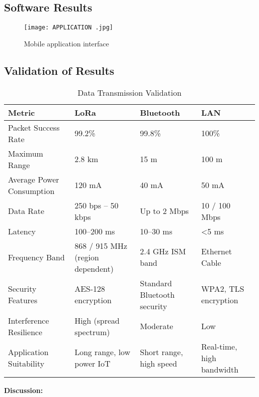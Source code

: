 \documentclass[12pt]{report}
\begin{document}
\subsection{Software Results}
\begin{figure}[H]
    \centering
    \texttt{[image: APPLICATION .jpg]}
    \caption{Mobile application interface}
    \label{fig:mobile_app}
\end{figure}

\subsection{Validation of Results}

\begin{table}[H]
\centering
\caption{Data Transmission Validation}
\label{tab:validation}
\renewcommand{\arraystretch}{1.2} %
\small %
\begin{tabularx}{\linewidth}{|l|X|X|X|}
\hline
\textbf{Metric} & \textbf{LoRa} & \textbf{Bluetooth} & \textbf{LAN} \\ \hline
Packet Success Rate & 99.2\% & 99.8\% & 100\% \\ \hline
Maximum Range & 2.8 km & 15 m & 100 m \\ \hline
Average Power Consumption & 120 mA & 40 mA & 50 mA \\ \hline
Data Rate & 250 bps – 50 kbps & Up to 2 Mbps & 10 / 100 Mbps \\ \hline
Latency & 100–200 ms & 10–30 ms & <5 ms \\ \hline
Frequency Band & 868 / 915 MHz (region dependent) & 2.4 GHz ISM band & Ethernet Cable \\ \hline
Security Features & AES-128 encryption & Standard Bluetooth security & WPA2, TLS encryption \\ \hline
Interference Resilience & High (spread spectrum) & Moderate & Low \\ \hline
Application Suitability & Long range, low power IoT & Short range, high speed & Real-time, high bandwidth \\ \hline
\end{tabularx}
\end{table}

\vspace{0.5cm}
\noindent
\textbf{Discussion:}
\end{document}
